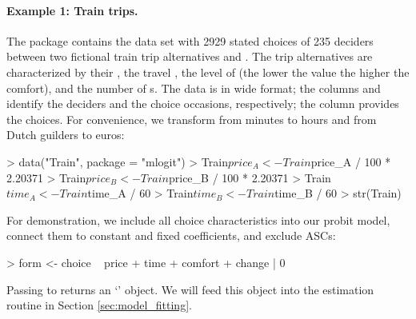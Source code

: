 \documentclass[article,shortnames]{jss}
\newcommand{\class}[1]{`\code{#1}'}
\newcommand{\fct}[1]{\code{#1()}}
\begin{document}
\paragraph{Example 1: Train trips.}

The  package contains the data set  with 2929 stated choices of 235 deciders between two fictional train trip alternatives  and . The trip alternatives are characterized by their , the travel , the level of  (the lower the value the higher the comfort), and the number of s. The data is in wide format; the columns  and  identify the deciders and the choice occasions, respectively; the column  provides the choices. For convenience, we transform  from minutes to hours and  from Dutch guilders to euros:

\begin{Schunk}
\begin{Sinput}
> data("Train", package = "mlogit")
> Train$price_A <- Train$price_A / 100 * 2.20371
> Train$price_B <- Train$price_B / 100 * 2.20371
> Train$time_A <- Train$time_A / 60
> Train$time_B <- Train$time_B / 60
> str(Train)
\end{Sinput}
\end{Schunk}

For demonstration, we include all choice characteristics into our probit model, connect them to constant and fixed coefficients, and exclude ASCs:

\begin{Schunk}
\begin{Sinput}
> form <- choice ~ price + time + comfort + change | 0
\end{Sinput}
\end{Schunk}

Passing  to \fct{prepare\_data} returns an \class{RprobitB\_data} object. We will feed this object into the estimation routine \fct{fit\_model} in Section \ref{sec:model_fitting}.
\end{document}
